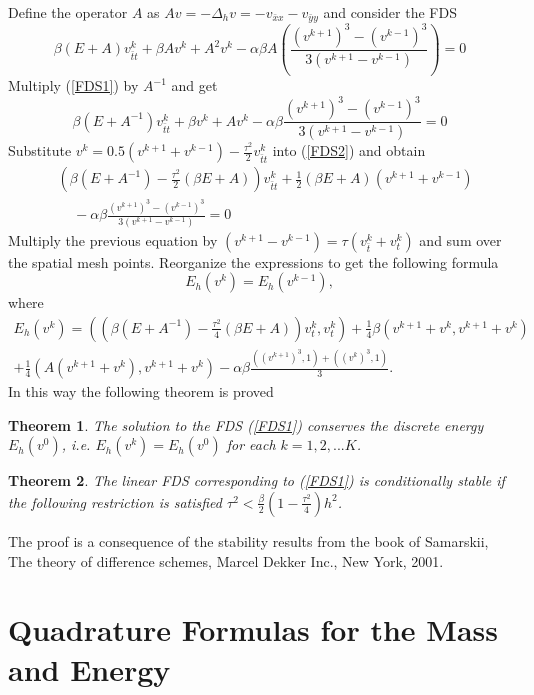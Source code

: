 \documentclass[%
 aip,
cp,  %
 amsmath,amssymb,%
 reprint,%
]{revtex4-2}
\newcommand{\be}{\begin{equation}}
\newcommand{\ee}{\end{equation}}
\newcommand{\rf}[1]{(\ref{#1})}
\newtheorem{thm}{Theorem}
\begin{document}
Define the operator $A$ as $Av=-\Delta_h v=-v_{\bar{x}x} - v_{\bar{y}y}$ and consider the FDS
\be\label{FDS1}
\beta (E+A)v_{\bar{t}t}^k +\beta Av^k+A^2 v^k -\alpha \beta A\left(\frac{(v^{k+1})^3-(v^{k-1})^3}{3(v^{k+1}-v^{k-1})} \right)=0
\ee
Multiply \rf{FDS1} by $A^{-1}$ and get 
\be\label{FDS2}
\beta (E+A^{-1})v_{\bar{t}t}^k +\beta v^k+A v^k -\alpha \beta \frac{(v^{k+1})^3-(v^{k-1})^3}{3(v^{k+1}-v^{k-1})} =0
\ee
Substitute $v^{k}=0.5(v^{k+1}+v^{k-1})-\frac{\tau^2}{2}v_{\bar{t}t}^k$ into \rf{FDS2}
and obtain
\begin{align*}
&\left( \beta (E+A^{-1})- \frac{\tau^2}{2}(\beta E+A ) \right)v_{\bar{t}t}^k  + \frac{1}{2} (\beta E +A )(v^{k+1}+v^{k-1}) \\
&~~~~~-\alpha \beta \frac{(v^{k+1})^3-(v^{k-1})^3}{3(v^{k+1}-v^{k-1})} =0
\end{align*}
Multiply the previous equation by $(v^{k+1}-v^{k-1})=\tau (v_{\bar{t}}^k + v_{t}^k)$ and sum over the spatial mesh points.
Reorganize the expressions to get the following formula 
\be \label{num_en}
E_h(v^k) =E_h(v^{k-1}),
\ee
where
\begin{align*}
E_h(v^k)=\left( \left( \beta (E+A^{-1})- \frac{\tau^2}{4}(\beta E+A ) \right)v_{t}^k ,v_{t}^k \right)+\frac{1}{4} \beta \left(  v^{k+1}+v^{k}, v^{k+1}+v^{k} \right) \\
+\frac{1}{4}  \left(  A(v^{k+1}+v^{k}), v^{k+1}+v^{k} \right)
-\alpha \beta \frac{((v^{k+1})^3,1)+((v^{k})^3,1)}{3}.
\end{align*}
In this way the following theorem is proved
\begin{thm}
The solution to the FDS \rf{FDS1} conserves the discrete energy
 $E_h(v^0)$, i.e.  $E_h(v^k) =E_h(v^{0})$ for each $k=1,2,...K$.
\end{thm}

\begin{thm}
The linear FDS corresponding to \rf{FDS1} is conditionally stable if
the following restriction is satisfied
$\tau^2 < \frac{\beta}{2}(1-\frac{\tau^2}{4}) h^2$.

\end{thm}
The proof is a consequence of the stability results from the book of
 Samarskii,  The theory of difference schemes, Marcel Dekker Inc., New York, 2001.

\section{Quadrature Formulas for the Mass and Energy}
\end{document}
